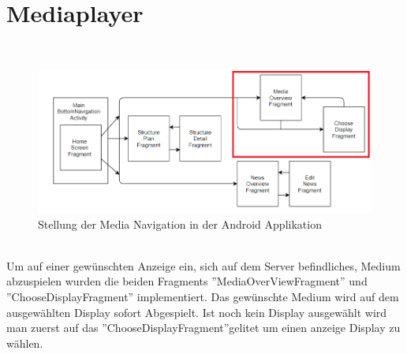 \section{Mediaplayer}
\\
\begin{figure}[H]
\centering
\includegraphics[width=1.0\textwidth]{images/06_AndroidApp/06_AndroidArchPlayMedia}
\caption{Stellung der Media Navigation in der Android Applikation}
\label{fig:mediaNav}
\end{figure}
\\
Um auf einer gewünschten Anzeige ein, sich auf dem Server befindliches, Medium abzuspielen wurden die beiden Fragments ''MediaOverViewFragment'' und ''ChooseDisplayFragment'' implementiert. Das gewünschte Medium wird auf dem ausgewählten Display sofort Abgespielt. Ist noch kein Display ausgewählt wird man zuerst auf das ''ChooseDisplayFragment''gelitet um einen anzeige Display zu wählen.
